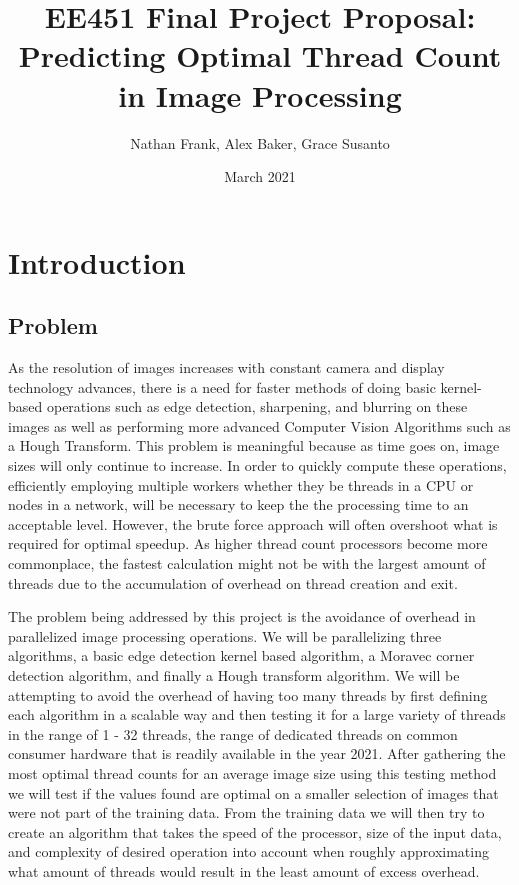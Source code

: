 \documentclass{article}
\title{EE451 Final Project Proposal: \\Predicting Optimal Thread Count in Image Processing}
\author{Nathan Frank, Alex Baker, Grace Susanto}
\date{March 2021}
\begin{document}
    \maketitle
    \tableofcontents
    \pagebreak
    
    \section{Introduction}
        \begin{multicols}{2}
            \subsection{Problem}
                As the resolution of images increases with constant camera and display technology advances, there is a need for faster methods of doing basic kernel-based operations such as edge detection, sharpening, and blurring on these images as well as performing more advanced Computer Vision Algorithms such as a Hough Transform.  This problem is meaningful because as time goes on, image sizes will only continue to increase.  In order to quickly compute these operations, efficiently employing multiple workers whether they be threads in a CPU or nodes in a network, will be necessary to keep the the processing time to an acceptable level.  However, the brute force approach will often overshoot what is required for optimal speedup.  As higher thread count processors become more commonplace, the fastest calculation might not be with the largest amount of threads due to the accumulation of overhead on thread creation and exit.
            
                The problem being addressed by this project is the avoidance of overhead in parallelized image processing operations.  We will be parallelizing three algorithms, a basic edge detection kernel based algorithm, a Moravec corner detection algorithm, and finally a Hough transform algorithm.  We will be attempting to avoid the overhead of having too many threads by first defining each algorithm in a scalable way and then testing it for a large variety of threads in the range of 1 - 32 threads, the range of dedicated threads on common consumer hardware that is readily available in the year 2021.  After gathering the most optimal thread counts for an average image size using this testing method we will test if the values found are optimal on a smaller selection of images that were not part of the training data.  From the training data we will then try to create an algorithm that takes the speed of the processor, size of the input data, and complexity of desired operation into account when roughly approximating what amount of threads would result in the least amount of excess overhead.


\end{multicols}
\end{document}
